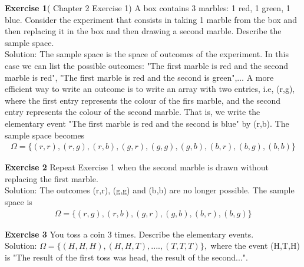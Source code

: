 \documentclass[reqno]{amsart}
\newcommand{\<}{{\langle \!\! \langle}}
\renewcommand{\>}{{\rangle \!\! \rangle}}
\newcommand{\bel}[2]{\begin{equation} \label{#1} \begin{split} #2
 					\end{split} \end{equation}}
\begin{document}
\textbf{Exercise 1}(\cite{Ross} Chapter 2 Exercise 1)
  A box contains 3 marbles: 1 red, 1 green, 1 blue. Consider the experiment that consists in taking 1 marble from the box and then replacing it in the box and then drawing a second marble. Describe the sample space.\\
  Solution: The sample space is the space of outcomes of the experiment. In this case we can list the possible outcomes: "The first marble is red and the second marble is red", "The first marble is red and the second is green",... A more efficient way to write an outcome is to write an array with two entries, i.e, (r,g), where the first entry represents the colour of the firs marble, and the second entry represents the colour of the second marble. That is, we write the elementary event "The first marble is red and the second is blue" by (r,b). The sample space becomes 
  \bel{ex1}{\Omega=\{(r,r), (r,g),(r,b),(g,r), (g,g),(g,b),(b,r),(b,g),(b,b)\}}
 
 \textbf{Exercise 2}
 Repeat Exercise 1 when the second marble is drawn without replacing the first marble.\\
 Solution: The outcomes (r,r), (g,g) and (b,b) are no longer possible. The sample space is 
 \bel{ex2}{\Omega=\{(r,g),(r,b),(g,r),(g,b),(b,r),(b,g)\}}
     
\textbf{Exercise 3}
You toss a coin 3 times. Describe the elementary events.\\
Solution: $\Omega=\{(H,H,H), (H,H,T),....,(T,T,T)\},$ where the event (H,T,H) is "The result of the first toss was head, the result of the second...". 
\end{document}
